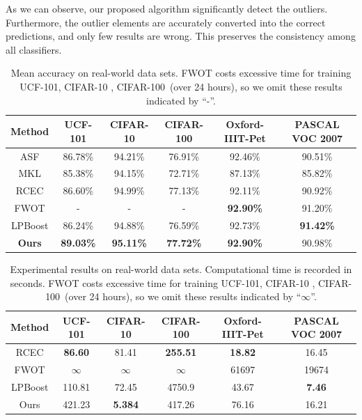 \documentclass[10pt,twocolumn,letterpaper]{article}
\begin{document}
As we can observe, our proposed algorithm significantly detect the outliers.
Furthermore, the outlier elements are accurately converted into the correct predictions, and only few results are wrong.
This preserves the consistency among all classifiers.


\begin{table}[t]
\centering
\begin{tabular}{|c|c|c|c|c|c|}
\hline
Method              & UCF-101          & CIFAR-10         & CIFAR-100        & Oxford-IIIT-Pet  & PASCAL VOC 2007    \\\hline
ASF                 & 86.78\%          & 94.21\%          & 76.91\%          & 92.46\%          &   90.51\%          \\
MKL                 & 85.38\%          & 94.15\%          & 72.71\%          & 87.13\%          &   85.82\%          \\
RCEC                & 86.60\%          & 94.99\%          & 77.13\%          & 92.11\%          &   90.92\%          \\
FWOT                & -                & -                & -                & \textbf{92.90\%} &   91.20\%          \\
LPBoost             & 86.24\%          & 94.88\%          & 76.59\%          & 92.73\%          &   \textbf{91.42\%} \\\hline
\textbf{Ours}       & \textbf{89.03\%} & \textbf{95.11\%} & \textbf{77.72\%} & \textbf{92.90\%} &   90.98\%          \\
\hline
\end{tabular}
\caption{Mean accuracy on real-world data sets.
FWOT costs excessive time for training UCF-101, CIFAR-10 , CIFAR-100~(over 24 hours),
so we omit these results indicated by ``-''.
}
\label{table:total_acc}
\end{table}


\begin{table}[t]
\centering
\begin{tabular}{|c|c|c|c|c|c|}
\hline
Method              & UCF-101         & CIFAR-10        & CIFAR-100        & Oxford-IIIT-Pet & PASCAL VOC 2007 \\\hline
RCEC                & \textbf{86.60}  & 81.41           &  \textbf{255.51} & \textbf{18.82}  &   16.45         \\
FWOT                & $\infty$        & $\infty$        &  $\infty$        & 61697           &   19674         \\
LPBoost             & 110.81          & 72.45           &  4750.9          & 43.67           &   \textbf{7.46} \\\hline
Ours                & 421.23          & \textbf{5.384}  &  417.26          & 76.16           &   16.21         \\
\hline
\end{tabular}
\caption{Experimental results on real-world data sets. Computational time is recorded in seconds.
FWOT costs excessive time for training UCF-101, CIFAR-10 , CIFAR-100~(over 24 hours),
so we omit these results indicated by ``$\infty$''.}
\label{table:total_time}
\end{table}
\end{document}

